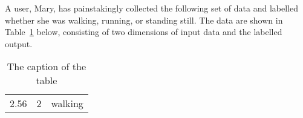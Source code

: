 \documentclass[12pt,a4paper,english
]{tutthesis2}
\begin{document}
A user, Mary, has painstakingly collected the following set of data and labelled whether she was walking, running, or standing still. The data are shown in Table~\ref{table:data-from-phone} below, consisting of two dimensions of input data and the labelled output.

\begin{table}
\begin{tabular}{lcc}
\hline\noalign{\smallskip}
2.56 & 2 & walking\\
\end{tabular}
\caption{The caption of the table}\label{table:data-from-phone}
\end{table}
\end{document}
